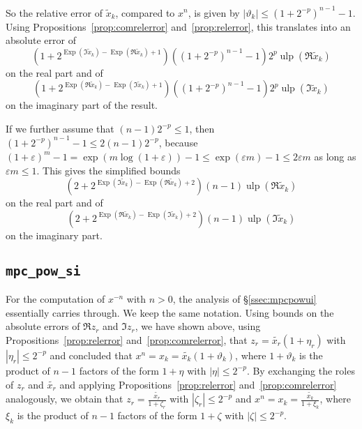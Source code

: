 \documentclass [11pt]{article}
\newcommand {\corr}[1]{{#1}}
\newcommand {\appro}[1]{\widetilde {#1}}
\newcommand {\Ulp}{{\operatorname {ulp}}}
\DeclareMathOperator{\Exp}{\operatorname {Exp}}
\renewcommand {\theta}{\vartheta}
\renewcommand {\leq}{\leqslant}
\begin{document}
So the relative error of $\appro x_k$, compared to $x^n$, is given by
$|\theta_k| \leq (1 + 2^{-p})^{n-1} - 1$.
Using Propositions~\ref {prop:comrelerror}
and~\ref {prop:relerror}, this translates into an absolute error of
\[
\left( 1 + 2^{\Exp (\Im \appro x_k) - \Exp (\Re \appro x_k) + 1} \right)
\left( (1 + 2^{-p})^{n-1} - 1 \right)
2^p \Ulp (\Re \appro x_k)
\]
on the real part and of
\[
\left( 1 + 2^{\Exp (\Re \appro x_k) - \Exp (\Im \appro x_k) + 1} \right)
\left( (1 + 2^{-p})^{n-1} - 1 \right)
2^p \Ulp (\Im \appro x_k)
\]
on the imaginary part of the result.

If we further assume that $(n-1) 2^{-p} \leq 1$, then
$(1 + 2^{-p})^{n-1} - 1 \leq 2 (n - 1) 2^{-p}$,
because $(1+\varepsilon)^m-1 = \exp(m \log(1+\varepsilon)) - 1
\leq \exp(\varepsilon m) - 1 \leq 2 \varepsilon m$ as long as
$\varepsilon m \leq 1$. This gives the simplified bounds
\begin{equation} \label{eq:powui_re}
\left( 2 + 2^{\Exp (\Im \appro x_k) - \Exp (\Re \appro x_k) + 2} \right)
(n-1) \Ulp (\Re \appro x_k)
\end{equation}
on the real part and of
\begin{equation} \label{eq:powui_im}
\left( 2 + 2^{\Exp (\Re \appro x_k) - \Exp (\Im \appro x_k) + 2} \right)
(n-1) \Ulp (\Im \appro x_k)
\end{equation}
on the imaginary part.


\subsection {\texttt {mpc\_pow\_si}}

For the computation of $x^{-n}$ with $n > 0$, the analysis of
\S\ref {ssec:mpcpowui} essentially carries through. We keep the same
notation. Using bounds on the absolute errors of $\Re z_r$ and $\Im z_r$,
we have shown above, using Propositions~\ref {prop:relerror}
and~\ref {prop:comrelerror}, that $z_r = \appro {x_r} (1 + \eta_r)$ with
$|\eta_r| \leq 2^{-p}$ and concluded that
$x^n = \corr {x_k} = \appro {x_k} (1 + \theta_k)$, where
$1 + \theta_k$ is the product of $n-1$ factors of the form
$1 + \eta$  with $|\eta| \leq 2^{-p}$.
By exchanging the roles of $z_r$ and $\appro {x_r}$ and applying
Propositions~\ref {prop:relerror} and~\ref {prop:comrelerror}
analogously, we obtain that $z_r = \frac {\appro {x_r}}{1 + \zeta_r}$ with
$|\zeta_r| \leq 2^{-p}$ and
$x^n = \corr {x_k} = \frac {\appro {x_k}}{1 + \xi_k}$, where
$\xi_k$ is the product of $n-1$ factors of the form
$1 + \zeta$  with $|\zeta| \leq 2^{-p}$.
\end{document}

